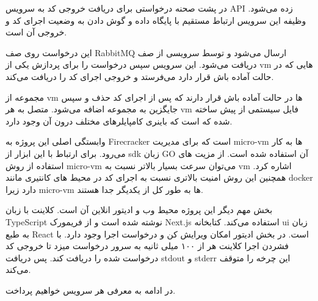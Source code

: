 در پشت صحنه درخواستی برای دریافت خروجی کد به سرویس API زده می‌شود. وظیفه این سرویس ارتباط مستقیم با پایگاه داده و گوش دادن به وضعیت اجرای کد و خروجی آن است.


این درخواست روی صف RabbitMQ ارسال می‌شود و توسط سرویسی از صف دریافت می‌شود.
این سرویس سپس درخواست را برای پردازش یکی از vm هایی که در حالت آماده باش قرار دارد می‌فرستد و خروجی اجرای کد را دریافت می‌کند.

مجموعه از vm ها در حالت آماده باش قرار دارند که پس از اجرای کد حذف و سپس جایگزین به مجموعه اضافه می‌شود.
متصل به هر vm فایل سیستمی از پیش ساخته شده که است که باینری کامپایلرهای مختلف درون آن وجود دارد.


وابستگی اصلی این پروژه به Firecracker است که برای مدیریت micro-vm ها به کار می‌رود.
برای ارتباط با این ابزار از sdk زبان GO آن استفاده شده است.
از مزیت های استفاده از روش micro-vm می‌توان سرعت بسیار بالاتر نسبت به vm اشاره کرد.
همچنین این روش امنیت بالاتری نسبت به اجرای کد در محیط های کانتیری مانند docker دارد زیرا micro-vm ها به طور کل از یکدیگر جدا هستند.

بخش مهم دیگر این پروژه محیط وب و ادیتور انلاین آن است. کلاینت با زبان TypeScript نوشته شده است و از فریمورک Next.js استفاده می‌کند.
کتابخانه ui زبان به طبع React است.
در بخش ادیتور امکان ویرایش کن و درخواست اجرا وجود دارد. با فشردن اجرا کلاینت هر از ۱۰۰ میلی ثانیه به سرور درخواست میزد تا خروجی کد درخواست شده را دریافت کند. پس دریافت stdout و stderr این چرخه را متوقف می‌کند.

در ادامه به معرفی هر سرویس خواهیم پرداخت.